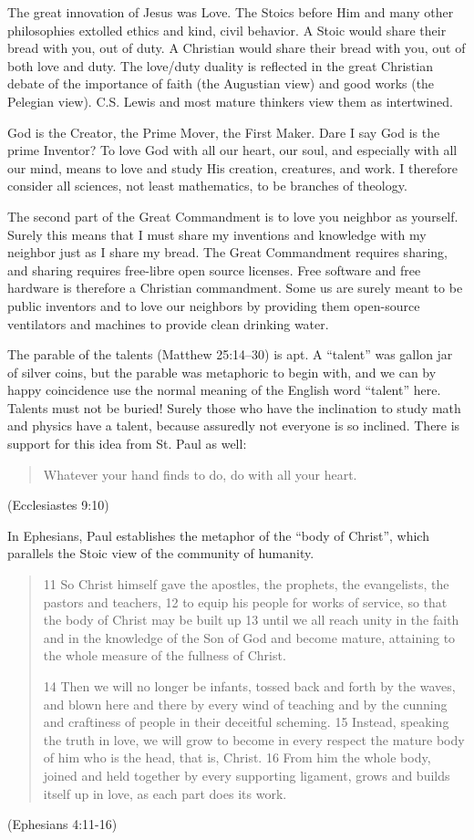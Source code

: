 \documentclass[
	fontsize=10pt, %
	twoside=false, %
	secnumdepth=1, %
]{kaobook}
\begin{document}
The great innovation of Jesus was Love.
The Stoics before Him and many other philosophies extolled ethics
and kind, civil behavior.
A Stoic would share their bread with you, out of duty.
A Christian would share their bread with you, out of both love and duty.
The love/duty duality is reflected in the great Christian debate
of the importance of faith (the Augustian view) and good works (the Pelegian view).
C.S. Lewis and most mature thinkers view them as intertwined.

God is the Creator, the Prime Mover, the First Maker.
Dare I say God is the prime Inventor?
To love God with all our heart, our soul, and especially
with all our mind, means to love and study His creation, creatures, and work.
I therefore consider all sciences, not least mathematics, to be branches of theology.

The second part of the Great Commandment is to love you neighbor
as yourself.
Surely this means that I must share my inventions and knowledge
with my neighbor just as I share my bread.
The Great Commandment requires sharing, and sharing requires
free-libre open source licenses.
Free software and free hardware is therefore a Christian commandment.
Some us are surely
meant to be public inventors and to love our neighbors
by providing them open-source ventilators and machines to provide clean drinking water.

The parable of the talents (Matthew 25:14–30)
is apt. A ``talent'' was gallon jar of silver coins, but
the parable was metaphoric to begin with, and we can
by happy coincidence use the normal meaning of the English word
``talent'' here.
Talents must not be buried!
Surely those who have the inclination to study math and physics
have a talent, because assuredly not everyone is so inclined.
There is support for this idea from St. Paul as well:
\blockquote{
  Whatever your hand finds to do, do with all your heart.}
(Ecclesiastes 9:10)

In Ephesians, Paul establishes the metaphor of the ``body of Christ'',
which parallels the Stoic view of the community of humanity.
\blockquote{
  11 So Christ himself gave the apostles, the prophets, the evangelists, the pastors and teachers,
  12 to equip his people for works of service, so that the body of Christ may be built up
  13 until we all reach unity in the faith and in the knowledge of the Son of God and become mature, attaining to the whole measure of the fullness of Christ.

  14 Then we will no longer be infants, tossed back and forth by the waves, and blown here and there by every wind of teaching and by the cunning and craftiness of people in their deceitful scheming.
  15 Instead, speaking the truth in love, we will grow to become in every respect the mature body of him who is the head, that is, Christ.
  16 From him the whole body, joined and held together by every supporting ligament, grows and builds itself up in love, as each part does its work.
}
(Ephesians 4:11-16)
\end{document}
